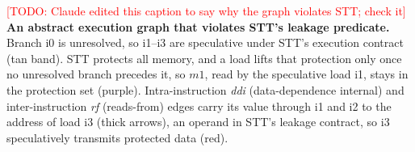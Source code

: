 \textcolor{red}{[TODO: Claude edited this caption to say why the graph violates STT; check it]} \textbf{An abstract execution graph that violates STT's leakage predicate.} Branch i0 is unresolved, so i1--i3 are speculative under STT's execution contract (tan band). STT protects all memory, and a load lifts that protection only once no unresolved branch precedes it, so $m1$, read by the speculative load i1, stays in the protection set (purple). Intra-instruction \emph{ddi} (data-dependence internal) and inter-instruction \emph{rf} (reads-from) edges carry its value through i1 and i2 to the address of load i3 (thick arrows), an operand in STT's leakage contract, so i3 speculatively transmits protected data (red).
